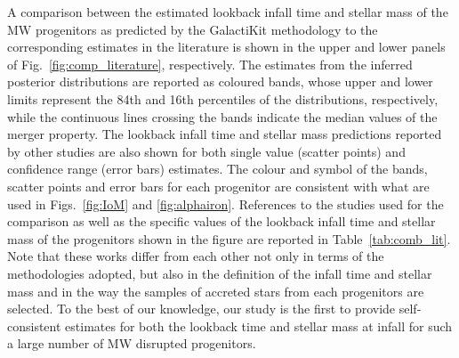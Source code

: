 A comparison between the estimated lookback infall time and stellar mass of the MW progenitors as predicted by the GalactiKit methodology to the corresponding estimates in the literature is shown in the upper and lower panels of Fig.~\ref{fig:comp_literature}, respectively. The estimates from the inferred posterior distributions are reported as coloured bands, whose upper and lower limits represent the 84th and 16th percentiles of the distributions, respectively, while the continuous lines crossing the bands indicate the median values of the merger property. The lookback infall time and stellar mass predictions reported by other studies are also shown for both single value (scatter points) and confidence range (error bars) estimates. The colour and symbol of the bands, scatter points and error bars for each progenitor are consistent with what are used in Figs.~\ref{fig:IoM} and \ref{fig:alphairon}. References to the studies used for the comparison as well as the specific values of the lookback infall time and stellar mass of the progenitors shown in the figure are reported in Table~\ref{tab:comb_lit}. Note that these works differ from each other not only in terms of the methodologies adopted, but also in the definition of the infall time and stellar mass and in the way the samples of accreted stars from each progenitors are selected. To the best of our knowledge, our study is the first to provide self-consistent estimates for both the lookback time and stellar mass at infall for such a large number of MW disrupted progenitors. 

